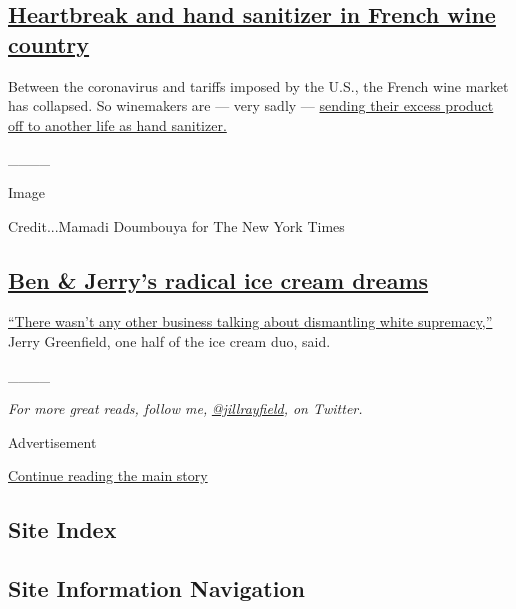 \hypertarget{heartbreak-and-hand-sanitizer-in-french-wine-country}{%
\subsection{\texorpdfstring{\href{https://www.nytimes3xbfgragh.onion/2020/07/27/world/europe/france-alsace-wine-coronavirus.html}{Heartbreak
and hand sanitizer in French wine
country}}{Heartbreak and hand sanitizer in French wine country}}\label{heartbreak-and-hand-sanitizer-in-french-wine-country}}

Between the coronavirus and tariffs imposed by the U.S., the French wine
market has collapsed. So winemakers are --- very sadly ---
\href{https://www.nytimes3xbfgragh.onion/2020/07/27/world/europe/france-alsace-wine-coronavirus.html}{sending
their excess product off to another life as hand sanitizer.}

\_\_\_\_

Image

Credit...Mamadi Doumbouya for The New York Times

\hypertarget{ben--jerrys-radical-ice-cream-dreams}{%
\subsection{\texorpdfstring{\href{https://www.nytimes3xbfgragh.onion/interactive/2020/07/27/magazine/ben-jerry-interview.html}{Ben
\& Jerry's radical ice cream
dreams}}{Ben \& Jerry's radical ice cream dreams}}\label{ben--jerrys-radical-ice-cream-dreams}}

\href{https://www.nytimes3xbfgragh.onion/interactive/2020/07/27/magazine/ben-jerry-interview.html}{``There
wasn't any other business talking about dismantling white supremacy,''}
Jerry Greenfield, one half of the ice cream duo, said.

\_\_\_\_

\emph{For more great reads, follow me,}
\href{https://twitter.com/jillrayfield}{\emph{@jillrayfield}}\emph{, on
Twitter.}

Advertisement

\protect\hyperlink{after-bottom}{Continue reading the main story}

\hypertarget{site-index}{%
\subsection{Site Index}\label{site-index}}

\hypertarget{site-information-navigation}{%
\subsection{Site Information
Navigation}\label{site-information-navigation}}

